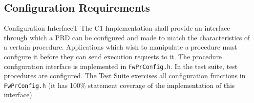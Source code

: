 \documentclass[requirements]{../fwprofile}
\begin{document}
\subsection{Configuration Requirements}\label{req:configInterfacePRD}

\begin{fw_req}{Configuration Interface}{T}
{The C1 Implementation shall provide an interface through which a PRD can 
be configured and made to match the characteristics of a certain procedure.}
{Applications which wish to manipulate a procedure must configure it 
before they can send execution requests to it.}
{The procedure configuration interface is implemented in 
\texttt{FwPrConfig.h}.} 
{In the test suite, test procedures are configured. 
The Test Suite exercises all configuration functions in \texttt{FwPrConfig.h} 
(it has 100\% statement coverage of the implementation of this interface).}
\end{fw_req}
\end{document}
